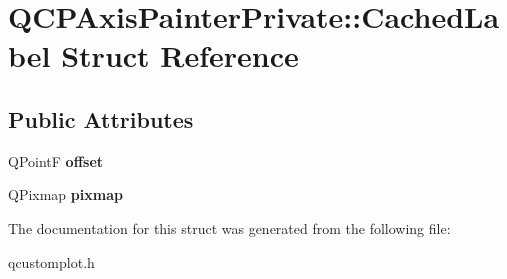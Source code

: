 \hypertarget{structQCPAxisPainterPrivate_1_1CachedLabel}{}\section{Q\+C\+P\+Axis\+Painter\+Private\+:\+:Cached\+Label Struct Reference}
\label{structQCPAxisPainterPrivate_1_1CachedLabel}
\subsection*{Public Attributes}
\begin{DoxyCompactItemize}
\item 
\mbox{\label{structQCPAxisPainterPrivate_1_1CachedLabel_a5f502db71c92e572f1e6f44f62c59d8e}} 
Q\+PointF {\bfseries offset}
\item 
\mbox{\label{structQCPAxisPainterPrivate_1_1CachedLabel_a461597cbd470914a9d24b64d16037a88}} 
Q\+Pixmap {\bfseries pixmap}
\end{DoxyCompactItemize}


The documentation for this struct was generated from the following file\+:\begin{DoxyCompactItemize}
\item 
qcustomplot.\+h\end{DoxyCompactItemize}
